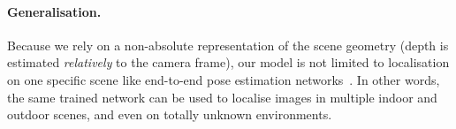 \paragraph{Generalisation.} Because we rely on a non-absolute representation of the scene geometry (depth is estimated \textit{relatively} to the camera frame), our model is not limited to localisation on one specific scene like end-to-end pose estimation networks~\citep{Kendall2017, Brachmann2017b}. In other words, the same trained network can be used to localise images in multiple indoor and outdoor scenes, and even on totally unknown environments. 
